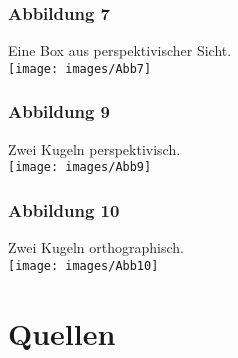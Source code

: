 \documentclass[14pt]{extarticle}
\begin{document}
\subsubsection{Abbildung 7}
Eine Box aus perspektivischer Sicht.\\
\texttt{[image: images/Abb7]}\\

\subsubsection{Abbildung 9}
Zwei Kugeln perspektivisch.\\
\texttt{[image: images/Abb9]}\\

\subsubsection{Abbildung 10}
Zwei Kugeln orthographisch.\\
\texttt{[image: images/Abb10]}\\


\section{Quellen}
\end{document}
